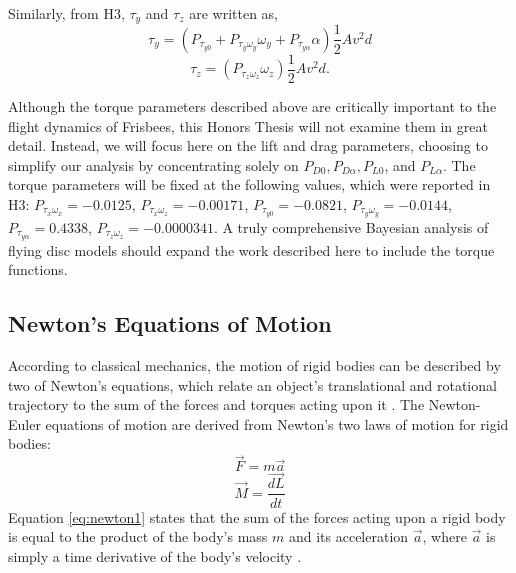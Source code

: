 \documentclass[a4paper,12pt, oneside]{article}
\begin{document}
Similarly, from H3, $\tau_y$ and $\tau_z$ are written as,
\begin{equation}
  \tau_y=(P_{\tau_{y0}}+P_{\tau_y\omega_y}\omega_y+P_{\tau_{y\alpha}}\alpha)\frac{1}2Av^2d
\end{equation}
\begin{equation}
  \tau_z=(P_{\tau_z\omega_z}\omega_z)\frac{1}2Av^2d.
\end{equation}

Although the torque parameters described above are critically important to the flight dynamics of Frisbees, this Honors Thesis will not examine them in great detail. Instead, we will focus here on the lift and drag parameters, choosing to simplify our analysis by concentrating solely on $P_{D0}, P_{D\alpha}, P_{L0}$, and $P_{L\alpha}$. The torque parameters will be fixed at the following values, which were reported in H3: $P_{\tau_x\omega_x}=-0.0125$, $P_{\tau_x\omega_z}=-0.00171$, $P_{\tau_{y0}}=-0.0821$, $P_{\tau_y\omega_y}=-0.0144$, $P_{\tau_{y\alpha}}=0.4338$, $P_{\tau_z\omega_z}=-0.0000341$. A truly comprehensive Bayesian analysis of flying disc models should expand the work described here to include the torque functions.

\subsection{Newton's Equations of Motion} 

According to classical mechanics, the motion of rigid bodies can be described by two of Newton's equations, which relate an object's translational and rotational trajectory to the sum of the forces and torques acting upon it \cite{gps}.  The Newton-Euler equations of motion are derived from Newton's two laws of motion for rigid bodies:
\begin{equation}
  \label{eq:newton1}
  \vec{F}=\textit{m}\vec{a}
\end{equation}
\begin{equation}
  \label{eq:newton2}
  \vec{M}=\dfrac{\vec{dL}}{dt}
\end{equation}
Equation \ref{eq:newton1} states that the sum of the forces acting upon a rigid body is equal to the product of the body's mass $\textit{m}$ and its acceleration $\vec{a}$, where $\vec{a}$ is simply a time derivative of the body's velocity \cite{gps}.  
\end{document}
